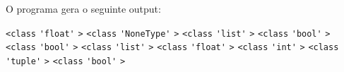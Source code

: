 \documentclass[12pt,varwidth=16cm,border=1pt]{standalone}
\begin{document}
O programa gera o seguinte output:

\verb+<class+ \verb+'float'+ \verb+>+ \newline
\verb+<class+ \verb+'NoneType'+ \verb+>+ \newline
\verb+<class+ \verb+'list'+ \verb+>+ \newline
\verb+<class+ \verb+'bool'+ \verb+>+ \newline
\verb+<class+ \verb+'bool'+ \verb+>+ \newline
\verb+<class+ \verb+'list'+ \verb+>+ \newline
\verb+<class+ \verb+'float'+ \verb+>+ \newline
\verb+<class+ \verb+'int'+ \verb+>+ \newline
\verb+<class+ \verb+'tuple'+ \verb+>+ \newline
\verb+<class+ \verb+'bool'+ \verb+>+
\end{document}
